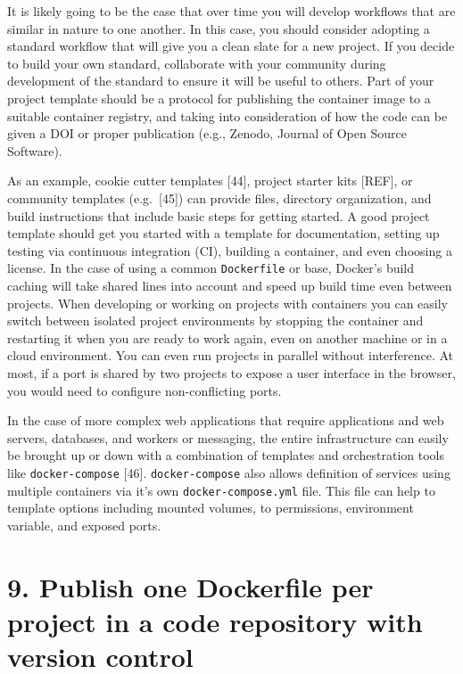 \documentclass[10pt,letterpaper]{article}
\begin{document}
It is likely going to be the case that over time you will develop
workflows that are similar in nature to one another. In this case, you
should consider adopting a standard workflow that will give you a clean
slate for a new project. If you decide to build your own standard,
collaborate with your community during development of the standard to
ensure it will be useful to others. Part of your project template should
be a protocol for publishing the container image to a suitable container
registry, and taking into consideration of how the code can be given a
DOI or proper publication (e.g., Zenodo, Journal of Open Source
Software).

As an example, cookie cutter templates {[}44{]}, project starter kits
{[}REF{]}, or community templates (e.g.~{[}45{]}) can provide files,
directory organization, and build instructions that include basic steps
for getting started. A good project template should get you started with
a template for documentation, setting up testing via continuous
integration (CI), building a container, and even choosing a license. In
the case of using a common \texttt{Dockerfile} or base, Docker's build
caching will take shared lines into account and speed up build time even
between projects. When developing or working on projects with containers
you can easily switch between isolated project environments by stopping
the container and restarting it when you are ready to work again, even
on another machine or in a cloud environment. You can even run projects
in parallel without interference. At most, if a port is shared by two
projects to expose a user interface in the browser, you would need to
configure non-conflicting ports.

In the case of more complex web applications that require applications
and web servers, databases, and workers or messaging, the entire
infrastructure can easily be brought up or down with a combination of
templates and orchestration tools like \texttt{docker-compose} {[}46{]}.
\texttt{docker-compose} also allows definition of services using
multiple containers via it's own \texttt{docker-compose.yml} file. This
file can help to template options including mounted volumes, to
permissions, environment variable, and exposed ports.

\hypertarget{publish-one-dockerfile-per-project-in-a-code-repository-with-version-control}{%
\section*{9. Publish one Dockerfile per project in a code repository
with version
control}\label{publish-one-dockerfile-per-project-in-a-code-repository-with-version-control}}
\end{document}
